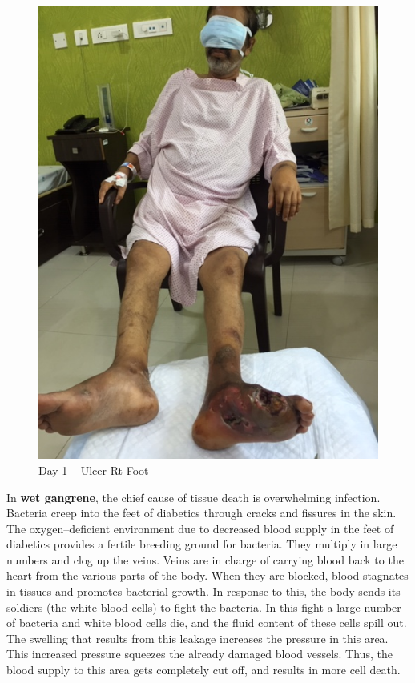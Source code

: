 {\begin{figure}
\includegraphics{images/068.jpg}
\caption{Day 1 – Ulcer Rt Foot}
\end{figure}

In \textbf{wet gangrene}, the chief cause of tissue death is overwhelming infection. Bacteria creep into the feet of diabetics through cracks and fissures in the skin. The oxygen–deficient environment due to decreased blood supply in the feet of diabetics provides a fertile breeding ground for bacteria. They multiply in large numbers and clog up the veins. Veins are in charge of carrying blood back to the heart from the various parts of the body. When they are blocked, blood stagnates in tissues and promotes bacterial growth. In response to this, the body sends its soldiers (the white blood cells) to fight the bacteria. In this fight a large number of bacteria and white blood cells die, and the fluid content of these cells spill out. The swelling that results from this leakage increases the pressure in this area. This increased pressure squeezes the already damaged blood vessels. Thus, the blood supply to this area gets completely cut off, and results in more cell death.

}
